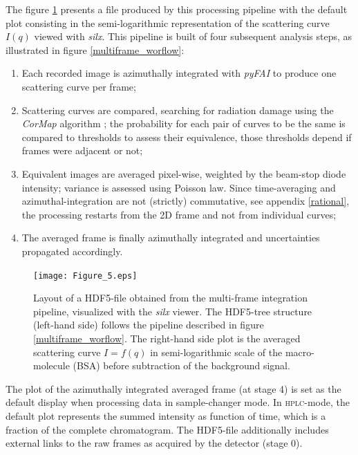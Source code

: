 \documentclass[preprint]{iucr}              %
\begin{document}
The figure \ref{multiframe} presents a file produced by this processing pipeline with the default plot consisting in the semi-logarithmic representation of the scattering curve $I(q)$ viewed with \textit{silx}.
This pipeline is built of four subsequent analysis steps, as illustrated in figure \ref{multiframe_worflow}:
\begin{enumerate}
\item Each recorded image is azimuthally integrated with \textit{pyFAI} \cite{pyfai_2020} to produce one scattering curve per frame;
\item Scattering curves are compared, searching for radiation damage using the \textit{CorMap} algorithm \cite{CorMap}; the probability for each pair of curves to be the same is compared to thresholds to assess their equivalence, those thresholds depend if frames were adjacent or not;
\item Equivalent images are averaged pixel-wise, weighted by the beam-stop diode intensity; variance is assessed using Poisson law. Since time-averaging and azimuthal-integration are not (strictly) commutative, see appendix \ref{rational}, the processing restarts from the 2D frame and not from individual curves;
\item The averaged frame is finally azimuthally integrated and uncertainties propagated accordingly. 
\end{enumerate}

\begin{figure}
     \caption{Layout of a HDF5-file obtained from the multi-frame integration pipeline, visualized with the \textit{silx} viewer.
     The HDF5-tree structure (left-hand side) follows the pipeline described in figure \ref{multiframe_worflow}.
     The right-hand side plot is the averaged scattering curve $I=f(q)$ in semi-logarithmic scale of the macro-molecule (BSA) before subtraction of the background signal.}
     \texttt{[image: Figure\_5.eps]}
     \label{multiframe}
\end{figure}

The plot of the azimuthally integrated averaged frame (at stage 4) is set as the default display  when processing data in sample-changer mode.
In \textsc{hplc}-mode, the default plot represents the summed intensity as function of time, which is a fraction of the complete chromatogram. 
The HDF5-file additionally includes external links to the raw frames as acquired by the detector (stage 0).
\end{document}
